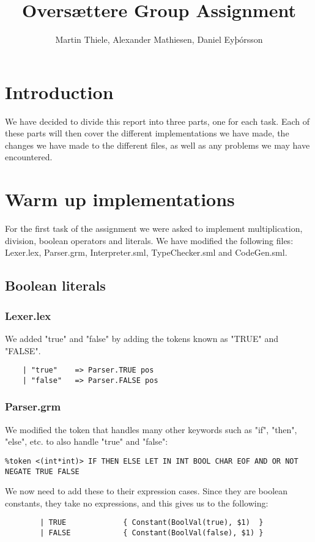 \documentclass[12pt]{article}
\title{Oversættere Group Assignment}
\author{Martin Thiele, Alexander Mathiesen, Daniel Eyþórsson}
\date{\parbox{\linewidth}{\centering%
  20. december 2015\endgraf\bigskip
  Studienummer: mqn507, pkq530, kzs773\endgraf\medskip
  Email: <Studienummer> @alumni.ku.dk\endgraf}}
\begin{document}
\maketitle

\section{Introduction}
We have decided to divide this report into three parts, one for each task. Each of these parts will then cover the different implementations we have made, the changes we have made to the different files, as well as any problems we may have encountered.
\section{Warm up implementations}
For the first task of the assignment we were asked to implement multiplication, division, boolean operators and literals. We have modified the following files: Lexer.lex, Parser.grm, Interpreter.sml, TypeChecker.sml and CodeGen.sml.
\subsection{Boolean literals}
\subsubsection{Lexer.lex}
We added "true" and "false" by adding the tokens known as "TRUE" and "FALSE". 
\begin{verbatim}
    | "true"    => Parser.TRUE pos
    | "false"   => Parser.FALSE pos
\end{verbatim}
\subsubsection{Parser.grm}
We modified the token that handles many other keywords such as "if", "then", "else", etc. to also handle "true" and "false": 
\begin{verbatim}
%token <(int*int)> IF THEN ELSE LET IN INT BOOL CHAR EOF AND OR NOT NEGATE TRUE FALSE
\end{verbatim}
We now need to add these to their expression cases. Since they are boolean constants, they take no expressions, and this gives us to the following:
\begin{verbatim}
        | TRUE             { Constant(BoolVal(true), $1)  }
        | FALSE            { Constant(BoolVal(false), $1) }
\end{verbatim}
\end{document}
